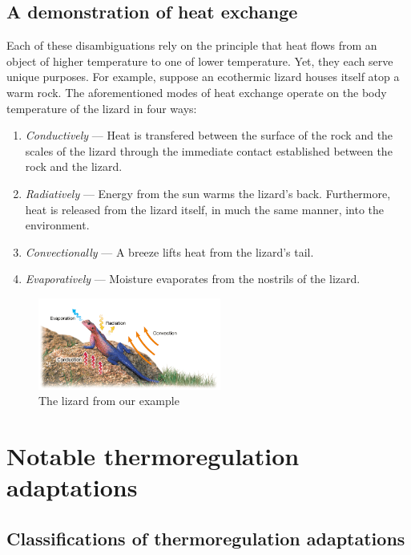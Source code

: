 \documentclass{article}
\begin{document}
\subsection{A demonstration of heat exchange}

Each of these disambiguations rely on the principle that heat flows from
an object of higher temperature to one of lower temperature. Yet, they
each serve unique purposes. For example, suppose an ecothermic lizard houses
itself atop a warm rock. The aforementioned modes of heat exchange operate on
the body temperature of the lizard in four ways:

\begin{enumerate}
	\item \emph{Conductively} --- Heat is transfered between the surface of the
		rock and the scales of the lizard through the immediate contact
		established between the rock and the lizard.
	\item \emph{Radiatively} --- Energy from the sun warms the
		lizard's back. Furthermore, heat is released from the lizard itself,
		in much the same manner, into the environment.
	\item \emph{Convectionally} --- A breeze lifts heat from the
		lizard's tail.
	\item \emph{Evaporatively} --- Moisture evaporates from the
		nostrils of the lizard.
\end{enumerate}

\begin{figure}[ht]
	\centering
	\includegraphics[width=6cm]{lizard_example.png}
	\caption{The lizard from our example}
\end{figure}

\pagebreak

\section{Notable thermoregulation adaptations}

\subsection{Classifications of thermoregulation adaptations}
\end{document}
